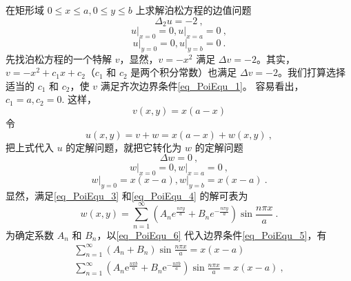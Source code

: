 \begin{example}{}
    在矩形域 $0\leq x\leq a, 0\leq y\leq b$ 上求解泊松方程的边值问题
    \begin{equation}
        \Delta_{2} u=-2~,
    \end{equation}
    \begin{equation} \label{eq_PoiEqu_1}
        \left.u\right|_{x=0}=0,\left.u\right|_{x=a}=0~,
    \end{equation}
    \begin{equation}\label{eq_PoiEqu_2}
        \left.u\right|_{y=0}=0,\left.u\right|_{y=b}=0~.
    \end{equation}
    先找泊松方程的一个特解 $v$，显然，$v=-x^2$ 满足 $\Delta v =-2$。其实，$v=-x^2+c_1x+c_2$（$c_1$ 和 $c_2$ 是两个积分常数）也满足 $\Delta v = -2$。我们打算选择适当的 $c_1$ 和 $c_2$，使 $v$ 满足齐次边界条件\autoref{eq_PoiEqu_1}。 容易看出，$c_1=a,c_2 = 0$.
    这样，
    \begin{equation}
        v(x,y) = x(a-x)
    \end{equation}
    令
    \begin{equation}
        u(x,y)=v+w=x(a-x)+w(x,y)~,
    \end{equation}
    把上式代入 $u$ 的定解问题，就把它转化为 $w $ 的定解问题
    \begin{equation} \label{eq_PoiEqu_3}
        \Delta w =0~,
    \end{equation}
    \begin{equation} \label{eq_PoiEqu_4}
        \left.w\right|_{x=0}=0,\left.w\right|_{x=a}=0~,
    \end{equation}
    \begin{equation} \label{eq_PoiEqu_5}
        \left.w\right|_{y=0}=x(x-a),\left.w\right|_{y=b}=x(x-a)~.
    \end{equation}
    显然，满足\autoref{eq_PoiEqu_3} 和\autoref{eq_PoiEqu_4} 的解可表为
    \begin{equation} \label{eq_PoiEqu_6}
        w(x, y)=\sum_{n=1}^{\infty}\left(A_{n} e^{\frac{n \pi y}{a}}+B_{n} e^{-\frac{n \pi y}{a}}\right) \sin \frac{n \pi x}{a}~.
    \end{equation}
    为确定系数 $A_n$ 和 $B_n$，以\autoref{eq_PoiEqu_6} 代入边界条件\autoref{eq_PoiEqu_5}，有
    \begin{equation}  \label{eq_PoiEqu_7}
        \begin{array}{l}\sum_{n=1}^{\infty}\left(A_{n}+B_{n}\right) \sin \frac{n \pi x}{a}=x(x-a) \\ \sum_{n=1}^{\infty}\left(A_{n} \mathrm{e}^{\frac{n \pi b}{a}}+B_{n} \mathrm{e}^{-\frac{n \pi b}{a}}\right) \sin \frac{n \pi x}{a}=x(x-a)~,\end{array}

\end{equation}
\end{example}

